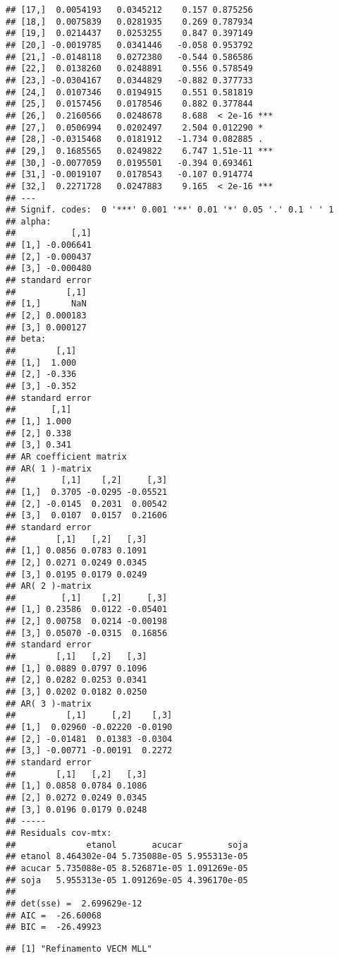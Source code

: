 \documentclass[]{article}
\begin{document}
\begin{verbatim}
## [17,]  0.0054193   0.0345212    0.157 0.875256    
## [18,]  0.0075839   0.0281935    0.269 0.787934    
## [19,]  0.0214437   0.0253255    0.847 0.397149    
## [20,] -0.0019785   0.0341446   -0.058 0.953792    
## [21,] -0.0148118   0.0272380   -0.544 0.586586    
## [22,]  0.0138260   0.0248891    0.556 0.578549    
## [23,] -0.0304167   0.0344829   -0.882 0.377733    
## [24,]  0.0107346   0.0194915    0.551 0.581819    
## [25,]  0.0157456   0.0178546    0.882 0.377844    
## [26,]  0.2160566   0.0248678    8.688  < 2e-16 ***
## [27,]  0.0506994   0.0202497    2.504 0.012290 *  
## [28,] -0.0315468   0.0181912   -1.734 0.082885 .  
## [29,]  0.1685565   0.0249822    6.747 1.51e-11 ***
## [30,] -0.0077059   0.0195501   -0.394 0.693461    
## [31,] -0.0019107   0.0178543   -0.107 0.914774    
## [32,]  0.2271728   0.0247883    9.165  < 2e-16 ***
## ---
## Signif. codes:  0 '***' 0.001 '**' 0.01 '*' 0.05 '.' 0.1 ' ' 1
## alpha:  
##           [,1]
## [1,] -0.006641
## [2,] -0.000437
## [3,] -0.000480
## standard error 
##          [,1]
## [1,]      NaN
## [2,] 0.000183
## [3,] 0.000127
## beta:  
##        [,1]
## [1,]  1.000
## [2,] -0.336
## [3,] -0.352
## standard error 
##       [,1]
## [1,] 1.000
## [2,] 0.338
## [3,] 0.341
## AR coefficient matrix 
## AR( 1 )-matrix 
##         [,1]    [,2]     [,3]
## [1,]  0.3705 -0.0295 -0.05521
## [2,] -0.0145  0.2031  0.00542
## [3,]  0.0107  0.0157  0.21606
## standard error 
##        [,1]   [,2]   [,3]
## [1,] 0.0856 0.0783 0.1091
## [2,] 0.0271 0.0249 0.0345
## [3,] 0.0195 0.0179 0.0249
## AR( 2 )-matrix 
##         [,1]    [,2]     [,3]
## [1,] 0.23586  0.0122 -0.05401
## [2,] 0.00758  0.0214 -0.00198
## [3,] 0.05070 -0.0315  0.16856
## standard error 
##        [,1]   [,2]   [,3]
## [1,] 0.0889 0.0797 0.1096
## [2,] 0.0282 0.0253 0.0341
## [3,] 0.0202 0.0182 0.0250
## AR( 3 )-matrix 
##          [,1]     [,2]    [,3]
## [1,]  0.02960 -0.02220 -0.0190
## [2,] -0.01481  0.01383 -0.0304
## [3,] -0.00771 -0.00191  0.2272
## standard error 
##        [,1]   [,2]   [,3]
## [1,] 0.0858 0.0784 0.1086
## [2,] 0.0272 0.0249 0.0345
## [3,] 0.0196 0.0179 0.0248
## ----- 
## Residuals cov-mtx: 
##              etanol       acucar         soja
## etanol 8.464302e-04 5.735088e-05 5.955313e-05
## acucar 5.735088e-05 8.526871e-05 1.091269e-05
## soja   5.955313e-05 1.091269e-05 4.396170e-05
##        
## det(sse) =  2.699629e-12 
## AIC =  -26.60068 
## BIC =  -26.49923
\end{verbatim}

\begin{verbatim}
## [1] "Refinamento VECM MLL"
\end{verbatim}
\end{document}
